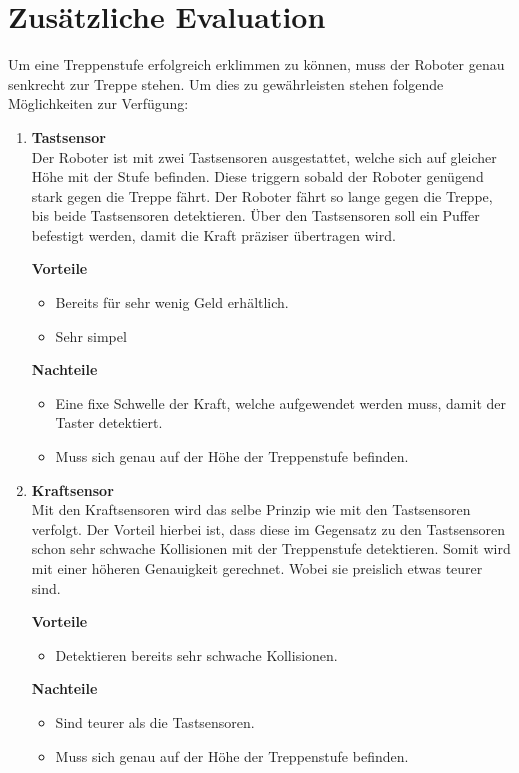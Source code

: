 \section{Zusätzliche Evaluation}\label{ausrichtung-zur-treppe-evaluation}
Um eine Treppenstufe erfolgreich erklimmen zu können, muss der Roboter genau senkrecht zur Treppe stehen. Um dies zu gewährleisten stehen folgende Möglichkeiten zur Verfügung:
\begin{enumerate}
    \item \textbf{Tastsensor}\\
    Der Roboter ist mit zwei Tastsensoren ausgestattet, welche sich auf gleicher Höhe mit der Stufe befinden. Diese triggern sobald der Roboter genügend stark gegen die Treppe fährt. Der Roboter fährt so lange gegen die Treppe, bis beide Tastsensoren detektieren. Über den Tastsensoren soll ein Puffer befestigt werden, damit die Kraft präziser übertragen wird.
    
    \textbf{Vorteile}
    \begin{itemize}
        \item Bereits für sehr wenig Geld erhältlich.
        \item Sehr simpel
    \end{itemize}
    \textbf{Nachteile}
    \begin{itemize}
        \item Eine fixe Schwelle der Kraft, welche aufgewendet werden muss, damit der Taster detektiert.
        \item Muss sich genau auf der Höhe der Treppenstufe befinden.
    \end{itemize}
    
    \item \textbf{Kraftsensor}\\
    Mit den Kraftsensoren wird das selbe Prinzip wie mit den Tastsensoren verfolgt. Der Vorteil hierbei ist, dass diese im Gegensatz zu den Tastsensoren schon sehr schwache Kollisionen mit der Treppenstufe detektieren. Somit wird mit einer höheren Genauigkeit gerechnet. Wobei sie preislich etwas teurer sind.
    
    \textbf{Vorteile}
    \begin{itemize}
        \item Detektieren bereits sehr schwache Kollisionen.
    \end{itemize}
    \textbf{Nachteile}
    \begin{itemize}
        \item Sind teurer als die Tastsensoren.
        \item Muss sich genau auf der Höhe der Treppenstufe befinden.
    \end{itemize}
    

\end{enumerate}
